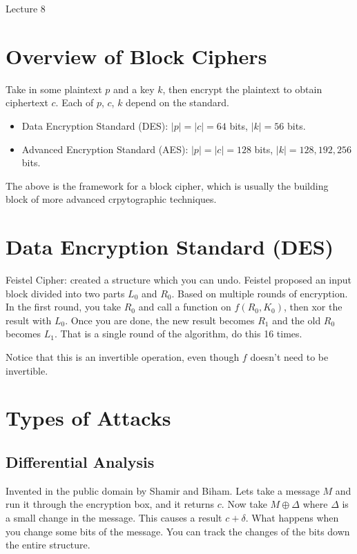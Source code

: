 \documentclass[psamsfonts]{amsart}
\begin{document}
\newpage
\Large{Lecture 8}


\maketitle

\section{Overview of Block Ciphers}

Take in some plaintext $p$ and a key $k$, then encrypt the plaintext to obtain ciphertext $c$. Each of $p$, $c$, $k$ depend on the standard.

\begin{itemize}
  \item Data Encryption Standard (DES): $|p| = |c| = 64$ bits, $|k| = 56$ bits.
  \item Advanced Encryption Standard (AES): $|p| = |c| = 128$ bits, $|k| = 128, 192, 256$ bits.
\end{itemize}

The above is the framework for a block cipher, which is usually the building block of more advanced crpytographic techniques.

\section{Data Encryption Standard (DES)}

Feistel Cipher: created a structure which you can undo. Feistel proposed an input block divided into two parts $L_0$ and $R_0$. Based on multiple rounds of encryption. In the first round, you take $R_0$ and call a function on $f(R_0, K_0)$, then xor the result with $L_0$. Once you are done, the new result becomes $R_1$ and the old $R_0$ becomes $L_1$. That is a single round of the algorithm, do this 16 times.

Notice that this is an invertible operation, even though $f$ doesn't need to be invertible.

\section{Types of Attacks}

\subsection{Differential Analysis}

Invented in the public domain by Shamir and Biham. Lets take a message $M$ and run it through the encryption box, and it returns $c$. Now take $M \oplus \Delta$ where $\Delta$ is a small change in the message. This causes a result $c + \delta$. What happens when you change some bits of the message. You can track the changes of the bits down the entire structure.
\end{document}
